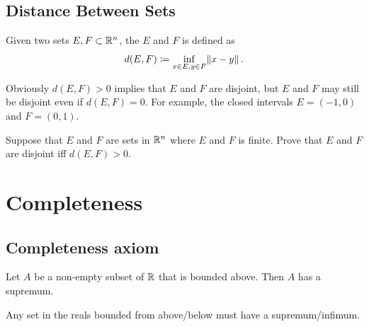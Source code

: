 \subsection{Distance Between Sets}
\begin{definition}
Given two sets $E,F\subset\mathbb R^n$, the  $E$ and $F$ is defined as
\[ d(E,F)\coloneqq\inf_{x\in E,y\in F}\norm{x-y}. \]
\end{definition}

Obviously $d(E,F)>0$ implies that $E$ and $F$ are disjoint, but $E$ and $F$ may still be disjoint even if $d(E,F)=0$. For example, the closed intervals $E=(-1,0)$ and $F=(0,1)$.

\begin{exercise}{}{}
Suppose that $E$ and $F$ are sets in $\mathbb R^n$ where $E$ and $F$ is finite. Prove that $E$ and $F$ are disjoint iff $d(E,F)>0$.
\end{exercise}
\pagebreak

\section{Completeness}
\subsection{Completeness axiom}
\begin{theorem}
Let $A$ be a non-empty subset of $\mathbb R$ that is bounded above. Then $A$ has a supremum.
\end{theorem}

Any set in the reals bounded from above/below must have a supremum/infimum.

